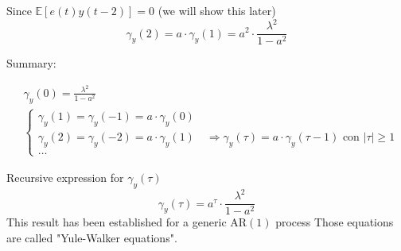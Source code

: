 Since $\mathbb{E}[e(t) y(t-2)]=0$ (we will show this later)
$$
\gamma_{y}(2)=a \cdot \gamma_{y}(1)=a^{2} \cdot \frac{\lambda^{2}}{1-a^{2}}
$$

Summary:

\begin{align*}
	&\gamma_{y}(0)=\frac{\lambda^{2}}{1-a^{2}} \\
	&\left\{\begin{array}{l}
		\gamma_{y}(1)=\gamma_{y}(-1)=a \cdot \gamma_{y}(0) \\
		\gamma_{y}(2)=\gamma_{y}(-2)=a \cdot \gamma_{y}(1) \quad \Rightarrow \gamma_{y}(\tau)=a \cdot \gamma_{y}(\tau-1) \text { con }|\tau| \geq 1 \\
		\ldots
	\end{array}\right.
\end{align*}

Recursive expression for $\gamma_{y}(\tau)$
$$
\gamma_{y}(\tau)=a^{\tau} \cdot \frac{\lambda^{2}}{1-a^{2}}
$$
This result has been established for a generic $\mathrm{AR}(1)$ process
Those equations are called "Yule-Walker equations".

